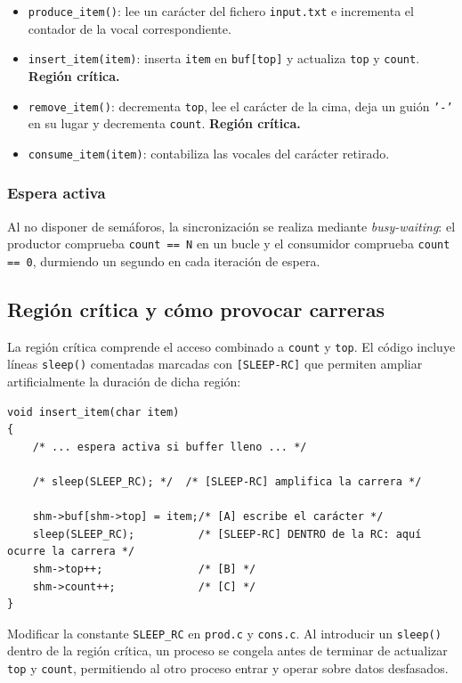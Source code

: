 \documentclass[a4paper, 12pt]{article}
\newcommand{\ic}[1]{\texttt{#1}}
\begin{document}
\begin{itemize}
  \item \ic{produce\_item()}: lee un carácter del fichero \ic{input.txt}
        e incrementa el contador de la vocal correspondiente.
  \item \ic{insert\_item(item)}: inserta \ic{item} en \ic{buf[top]} y
        actualiza \ic{top} y \ic{count}. \textbf{Región crítica.}
  \item \ic{remove\_item()}: decrementa \ic{top}, lee el carácter de la
        cima, deja un guión \ic{'-'} en su lugar y decrementa \ic{count}.
        \textbf{Región crítica.}
  \item \ic{consume\_item(item)}: contabiliza las vocales del carácter
        retirado.
\end{itemize}

\subsubsection*{Espera activa}

Al no disponer de semáforos, la sincronización se realiza mediante
\emph{busy-waiting}: el productor comprueba \ic{count == N} en un bucle
y el consumidor comprueba \ic{count == 0}, durmiendo un segundo en cada
iteración de espera.

\subsection{Región crítica y cómo provocar carreras}

La región crítica comprende el acceso combinado a \ic{count} y \ic{top}.
El código incluye líneas \ic{sleep()} comentadas marcadas con
\ic{[SLEEP-RC]} que permiten ampliar artificialmente la duración de dicha
región:

\begin{lstlisting}[style=cstyle,
  caption={Fragmento de \texttt{insert\_item()} en \texttt{prod.c}}]
void insert_item(char item)
{
    /* ... espera activa si buffer lleno ... */

    /* sleep(SLEEP_RC); */  /* [SLEEP-RC] amplifica la carrera */

    shm->buf[shm->top] = item;/* [A] escribe el carácter */
    sleep(SLEEP_RC);          /* [SLEEP-RC] DENTRO de la RC: aquí ocurre la carrera */
    shm->top++;               /* [B] */
    shm->count++;             /* [C] */
}
\end{lstlisting}

\begin{warnbox}
  Modificar la constante \texttt{SLEEP\_RC} en \texttt{prod.c} y \texttt{cons.c}.
  Al introducir un \texttt{sleep()} dentro de la región crítica, un proceso se 
  congela antes de terminar de actualizar \texttt{top} y \texttt{count}, permitiendo 
  al otro proceso entrar y operar sobre datos desfasados.
\end{warnbox}
\end{document}
